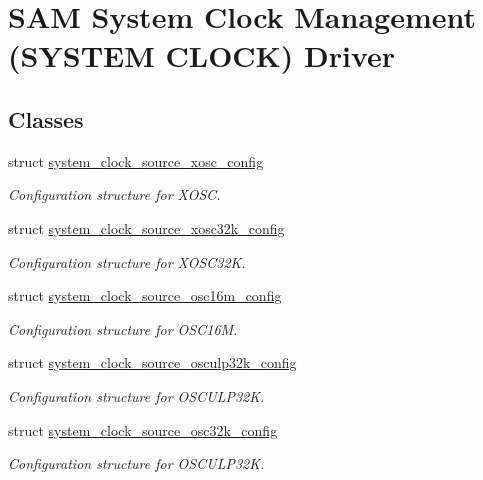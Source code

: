 \hypertarget{group__asfdoc__sam0__system__clock__group}{}\section{S\+A\+M System Clock Management (S\+Y\+S\+T\+E\+M C\+L\+O\+C\+K) Driver}
\label{group__asfdoc__sam0__system__clock__group}
\subsection*{Classes}
\begin{DoxyCompactItemize}
\item 
struct \hyperlink{structsystem__clock__source__xosc__config}{system\+\_\+clock\+\_\+source\+\_\+xosc\+\_\+config}
\begin{DoxyCompactList}\small\item\em Configuration structure for X\+O\+S\+C. \end{DoxyCompactList}\item 
struct \hyperlink{structsystem__clock__source__xosc32k__config}{system\+\_\+clock\+\_\+source\+\_\+xosc32k\+\_\+config}
\begin{DoxyCompactList}\small\item\em Configuration structure for X\+O\+S\+C32\+K. \end{DoxyCompactList}\item 
struct \hyperlink{structsystem__clock__source__osc16m__config}{system\+\_\+clock\+\_\+source\+\_\+osc16m\+\_\+config}
\begin{DoxyCompactList}\small\item\em Configuration structure for O\+S\+C16\+M. \end{DoxyCompactList}\item 
struct \hyperlink{structsystem__clock__source__osculp32k__config}{system\+\_\+clock\+\_\+source\+\_\+osculp32k\+\_\+config}
\begin{DoxyCompactList}\small\item\em Configuration structure for O\+S\+C\+U\+L\+P32\+K. \end{DoxyCompactList}\item 
struct \hyperlink{structsystem__clock__source__osc32k__config}{system\+\_\+clock\+\_\+source\+\_\+osc32k\+\_\+config}
\begin{DoxyCompactList}\small\item\em Configuration structure for O\+S\+C\+U\+L\+P32\+K. \end{DoxyCompactList}\item 

\end{DoxyCompactItemize}
